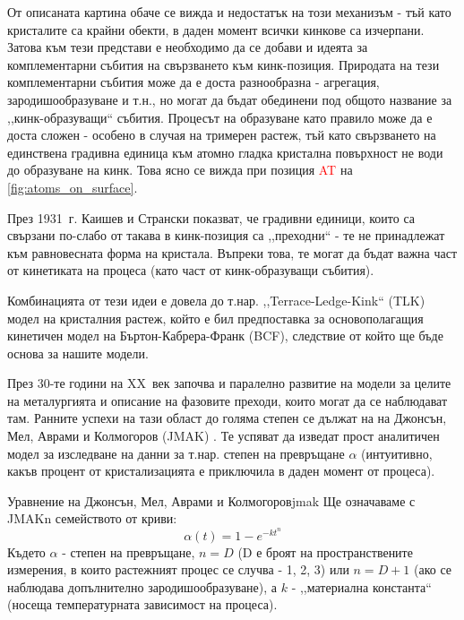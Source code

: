 От описаната картина обаче се вижда и недостатък на този механизъм - тъй като кристалите са крайни обекти, в даден момент всички кинкове са изчерпани. Затова към тези представи е необходимо да се добави и идеята за комплементарни събития на свързването към кинк-позиция. Природата на тези комплементарни събития може да е доста разнообразна - агрегация, зародишообразуване и т.н., но могат да бъдат обединени под общото название за ,,кинк-образуващи`` събития.
Процесът на образуване като правило може да е доста сложен - особено в случая на тримерен растеж, тъй като свързването на единствена градивна единица към атомно гладка кристална повърхност не води до образуване на кинк. Това ясно се вижда при позиция \textcolor{red}{AT} на \autoref{fig:atoms_on_surface}.

През 1931~г. Каишев и Странски показват, че градивни единици, които са свързани по-слабо от такава в кинк-позиция са ,,преходни`` - те не принадлежат към равновесната форма на кристала. Въпреки това, те могат да бъдат важна част от кинетиката на процеса (като част от кинк-образуващи събития). \cite{StranskiKaischew1931}\cite{Yamamoto1988}

Комбинацията от тези идеи е довела до т.нар. ,,Terrace-Ledge-Kink`` (TLK) модел на кристалния растеж, който е бил предпоставка за основополагащия кинетичен модел на Бъртон-Кабрера-Франк (BCF), следствие от който ще бъде основа за нашите модели. \cite{BCF1951}\cite{Chernov2004}

През 30-те години на XX~век започва и паралелно развитие на модели за целите на металургията и описание на фазовите преходи, които могат да се наблюдават там. Ранните успехи на тази област до голяма степен се дължат на на Джонсън, Мел, Аврами и Колмогоров (JMAK) \cite{Mehl1939} \cite{Lambrigger1998}. Те успяват да изведат прост аналитичен модел за изследване на данни за т.нар. степен на превръщане $\alpha$ (интуитивно, какъв процент от кристализацията е приключила в даден момент от процеса).

\begin{premise}{Уравнение на Джонсън, Мел, Аврами и Колмогоров}{jmak}
    Ще означаваме с JMAKn семейството от криви:
    \begin{equation}
        \label{eq:jmak}
        \alpha(t) = 1 - e^{ - k t^n }
    \end{equation}
    Където $\alpha$ - степен на превръщане, $n = D$ (D е броят на пространствените измерения, в които растежният процес се случва - 1, 2, 3) или $n = D+1$ (ако се наблюдава допълнително зародишообразуване), а $k$ - ,,материална константа`` (носеща температурната зависимост на процеса).
\end{premise}

